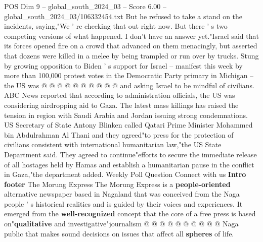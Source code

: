 \begin{textsample}{POS Dim 9 – global\_south\_2024\_03 – Score 6.00 – global\_south\_2024\_03/106332454.txt}
But he refused to take a stand on the incidents, saying,"We ' re checking that out right now.
But there ' s two competing versions of what happened.
I don't have an answer yet."Israel said that its forces opened fire on a crowd that advanced on them menacingly, but asserted that dozens were killed in a melee by being trampled or run over by trucks.
Stung by growing opposition to Biden ' s support for Israel -- manifest this week by more than 100,000 protest votes in the Democratic Party primary in Michigan -- the US was @ @ @ @ @ @ @ @ @ @ and asking Israel to be mindful of civilians.
ABC News reported that according to administration officials, the US was considering airdropping aid to Gaza.
The latest mass killings has raised the tension in region with Saudi Arabia and Jordan issuing strong condemnations.
US Secretary of State Antony Blinken called Qatari Prime Minister Mohammed bin Abdulrahman Al Thani and they agreed"to press for the protection of civilians consistent with international humanitarian law,"the US State Department said.
They agreed to continue"efforts to secure the immediate release of all hostages held by Hamas and establish a humanitarian pause in the conflict in Gaza,"the department added.
Weekly Poll Question Connect with us \textbf{Intro} \textbf{footer} The Morung Express The Morung Express is a \textbf{people-oriented} alternative newspaper based in Nagaland that was conceived from the Naga people ' s historical realities and is guided by their voices and experiences.
It emerged from the \textbf{well-recognized} concept that the core of a free press is based on"\textbf{qualitative} and investigative"journalism @ @ @ @ @ @ @ @ @ @ Naga public that makes sound decisions on issues that affect all \textbf{spheres} of life.

\end{textsample}
